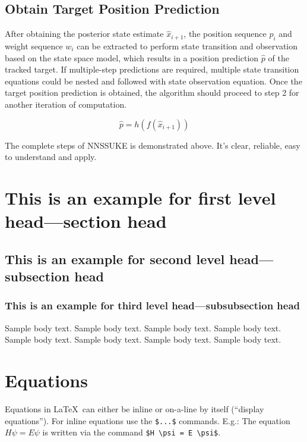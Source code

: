 \documentclass[sn-nature]{sn-jnl}%
\theoremstyle{thmstyleone}%
\theoremstyle{thmstyletwo}%
\theoremstyle{thmstylethree}%
\begin{document}
\subsection{Obtain Target Position Prediction}

After obtaining the posterior state estimate ${{\hat x}_{i + 1}}$, the position sequence ${p_i}$ and weight sequence ${w_i}$ can be extracted to perform state transition and observation based on the state space model, which results in a position prediction ${\hat p}$ of the tracked target. If multiple-step predictions are required, multiple state transition equations could be nested and followed with state observation equation. Once the target position prediction is obtained, the algorithm should proceed to step 2 for another iteration of computation.

\begin{equation}
\hat p = h(f({{\hat x}_{i + 1}}))
\label{2_12}
\end{equation}

The complete steps of NNSSUKE is demonstrated above. It’s clear, reliable, easy to understand and apply.

\section{This is an example for first level head---section head}\label{sec31}

\subsection{This is an example for second level head---subsection head}\label{subsec2}

\subsubsection{This is an example for third level head---subsubsection head}\label{subsubsec2}

Sample body text. Sample body text. Sample body text. Sample body text. Sample body text. Sample body text. Sample body text. Sample body text. 

\section{Equations}\label{sec4}

Equations in \LaTeX\ can either be inline or on-a-line by itself (``display equations''). For
inline equations use the \verb+$...$+ commands. E.g.: The equation
$H\psi = E \psi$ is written via the command \verb+$H \psi = E \psi$+.
\end{document}

